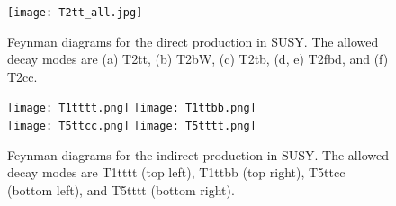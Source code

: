 \begin{figure}[!h]
	\begin{center}
		\texttt{[image: T2tt\_all.jpg]}
	\end{center}
	\caption[Direct Top Squark Production]{Feynman diagrams for the direct \st{} production in SUSY. The allowed decay modes are (a) T2tt, (b) T2bW, (c) T2tb, (d, e) T2fbd, and (f) T2cc. }
	\label{fig:stop-direct-production}
\end{figure}

\begin{figure}[!h]
	\begin{center}
		\texttt{[image: T1tttt.png]}
		\texttt{[image: T1ttbb.png]} \\
		\texttt{[image: T5ttcc.png]}
		\texttt{[image: T5tttt.png]} \\
	\end{center}
	\caption[Gluino Mediated Top Squark Production]{Feynman diagrams for the indirect \st{} production in SUSY. The allowed decay modes are T1tttt (top left), T1ttbb (top right), T5ttcc (bottom left), and T5tttt (bottom right).
	}
	\label{fig:stop-gluino-production}
\end{figure}
